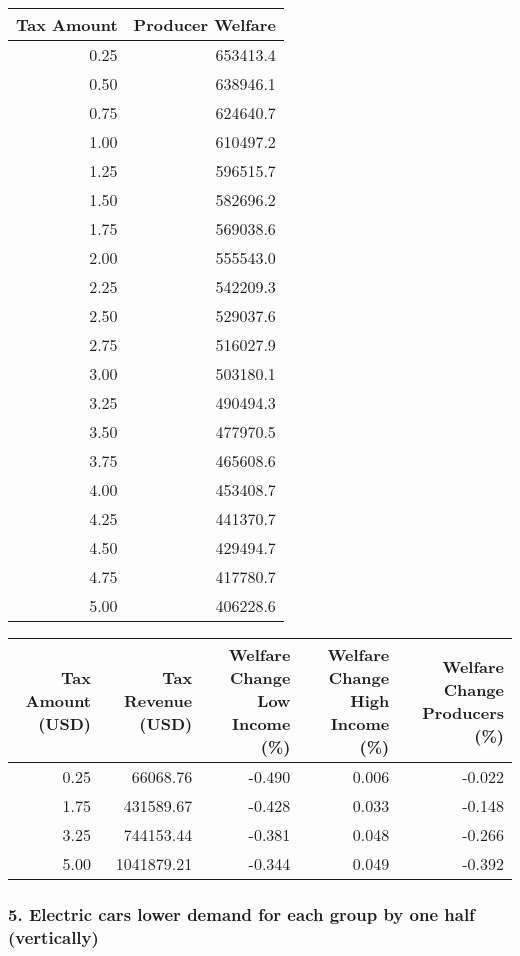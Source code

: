 \documentclass[]{article}
\begin{document}
\begin{table}[H]
\centering
\begin{tabular}{r|r}
\hline
Tax Amount & Producer Welfare\\
\hline
0.25 & 653413.4\\
\hline
0.50 & 638946.1\\
\hline
0.75 & 624640.7\\
\hline
1.00 & 610497.2\\
\hline
1.25 & 596515.7\\
\hline
1.50 & 582696.2\\
\hline
1.75 & 569038.6\\
\hline
2.00 & 555543.0\\
\hline
2.25 & 542209.3\\
\hline
2.50 & 529037.6\\
\hline
2.75 & 516027.9\\
\hline
3.00 & 503180.1\\
\hline
3.25 & 490494.3\\
\hline
3.50 & 477970.5\\
\hline
3.75 & 465608.6\\
\hline
4.00 & 453408.7\\
\hline
4.25 & 441370.7\\
\hline
4.50 & 429494.7\\
\hline
4.75 & 417780.7\\
\hline
5.00 & 406228.6\\
\hline
\end{tabular}
\end{table}

\begin{table}[H]
\centering
\begin{tabular}{r|r|r|r|r}
\hline
Tax Amount (USD) & Tax Revenue (USD) & Welfare Change Low Income (\%) & Welfare Change High Income (\%) & Welfare Change Producers (\%)\\
\hline
0.25 & 66068.76 & -0.490 & 0.006 & -0.022\\
\hline
1.75 & 431589.67 & -0.428 & 0.033 & -0.148\\
\hline
3.25 & 744153.44 & -0.381 & 0.048 & -0.266\\
\hline
5.00 & 1041879.21 & -0.344 & 0.049 & -0.392\\
\hline
\end{tabular}
\end{table}

\subsubsection{5. Electric cars lower demand for each group by one half
(vertically)}\label{electric-cars-lower-demand-for-each-group-by-one-half-vertically}
\end{document}
